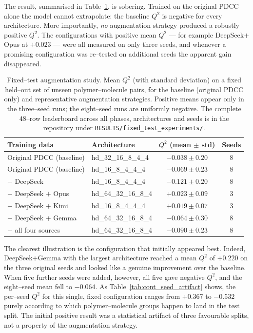 The result, summarised in Table~\ref{tab:cont_fixed_test}, is sobering. Trained on the original PDCC alone the model cannot extrapolate: the baseline $Q^2$ is negative for every architecture. More importantly, \emph{no} augmentation strategy produced a robustly positive $Q^2$. The configurations with positive mean $Q^2$ --- for example DeepSeek$+$Opus at $+0.023$ --- were all measured on only three seeds, and whenever a promising configuration was re--tested on additional seeds the apparent gain disappeared.

\begin{table}[htbp]
	\centering
	\caption{Fixed--test augmentation study. Mean $Q^2$ (with standard deviation) on a fixed held--out set of unseen polymer--molecule pairs, for the baseline (original PDCC only) and representative augmentation strategies. Positive means appear only in the three--seed runs; the eight--seed runs are uniformly negative. The complete $48$--row leaderboard across all phases, architectures and seeds is in the repository \cite{repo} under \texttt{RESULTS/fixed\_test\_experiments/}.}
	\label{tab:cont_fixed_test}
	\begin{tabular}{llcc}
		\toprule
		\textbf{Training data}      & \textbf{Architecture} & \textbf{$Q^2$ (mean $\pm$ std)} & \textbf{Seeds} \\
		\midrule
		Original PDCC (baseline)    & hd\_32\_16\_8\_4\_4  & $-0.038 \pm 0.20$ & 8 \\
		Original PDCC (baseline)    & hd\_16\_8\_4\_4\_4   & $-0.069 \pm 0.23$ & 8 \\
		$+$ DeepSeek                & hd\_16\_8\_4\_4\_4   & $-0.121 \pm 0.20$ & 8 \\
		$+$ DeepSeek $+$ Opus       & hd\_64\_32\_16\_8\_4 & $+0.023 \pm 0.09$ & 3 \\
		$+$ DeepSeek $+$ Kimi       & hd\_16\_8\_4\_4\_4   & $+0.019 \pm 0.07$ & 3 \\
		$+$ DeepSeek $+$ Gemma      & hd\_64\_32\_16\_8\_4 & $-0.064 \pm 0.30$ & 8 \\
		$+$ all four sources        & hd\_64\_32\_16\_8\_4 & $-0.090 \pm 0.23$ & 8 \\
		\bottomrule
	\end{tabular}
\end{table}

The clearest illustration is the configuration that initially appeared best. Indeed, DeepSeek$+$Gemma with the largest architecture reached a mean $Q^2$ of $+0.220$ on the three original seeds and looked like a genuine improvement over the baseline. When five further seeds were added, however, all five gave negative $Q^2$, and the eight--seed mean fell to $-0.064$. As Table~\ref{tab:cont_seed_artifact} shows, the per--seed $Q^2$ for this single, fixed configuration ranges from $+0.367$ to $-0.532$ purely according to which polymer--molecule groups happen to land in the test split. The initial positive result was a statistical artifact of three favourable splits, not a property of the augmentation strategy.

